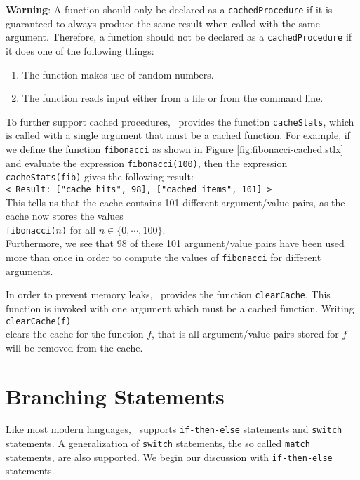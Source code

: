 \vspace*{0.3cm}

\noindent
\textbf{Warning}:  A function should only be declared as a \texttt{cachedProcedure} if it is
guaranteed to always produce the same result when called with the same argument.
Therefore, a function should not be declared as a \texttt{cachedProcedure} if it does one
of the following things:
\begin{enumerate}
\item The function makes use of random numbers.
\item The function reads input either from a file or from the command line.
\end{enumerate}
To further support cached procedures,  \setlx\ provides the function \texttt{cacheStats},
which is called with a single argument that must be a cached function.  For example, if
we define the function \texttt{fibonacci} as shown in Figure
\ref{fig:fibonacci-cached.stlx} and evaluate the expression \texttt{fibonacci(100)}, then
the expression \texttt{cacheStats(fib)} gives the following result:
\\[0.2cm]
\hspace*{1.3cm}
\texttt{< Result: {["cache hits", 98], ["cached items", 101]} >}
\\[0.2cm]
This tells us that the cache contains 101 different argument/value pairs, as the cache
now stores the values
\\[0.2cm]
\hspace*{1.3cm}
\texttt{fibonacci($n$)} \quad for all $n \in \{0,\cdots,100\}$.
\\[0.2cm]
Furthermore, we see that 98 of these 101 argument/value pairs have
been used more than once in order to
compute the values of \texttt{fibonacci} for different arguments.  

In order to prevent memory leaks, \setlx\ provides the function \texttt{clearCache}.  This
function is invoked with one argument which must be a cached function.  Writing
\\[0.2cm]
\hspace*{1.3cm}
\texttt{clearCache(f)}
\\[0.2cm]
clears the cache for the function $f$, that is all argument/value pairs stored for $f$
will be removed from the cache.


\section{Branching Statements}
Like most modern languages, \setlx\ supports \texttt{if-then-else} statements and
\texttt{switch} statements.  A generalization of \texttt{switch} statements, the so called
\texttt{match} statements, are also supported. We begin our discussion with
\texttt{if-then-else} statements.

